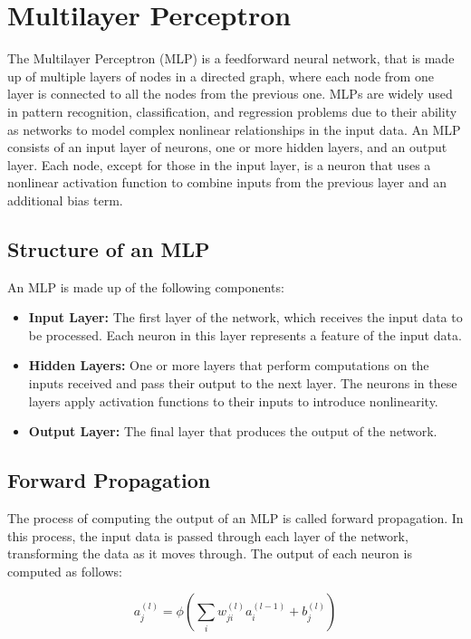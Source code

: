 \section{Multilayer Perceptron}
The Multilayer Perceptron (MLP) \cite{multilayer_perceptron} is a feedforward neural network, that is made up of multiple layers of nodes in a directed graph, where each node from one layer is connected to all the nodes from the previous one.
MLPs are widely used in pattern recognition, classification, and regression problems due to their ability as networks to model complex nonlinear relationships in the input data.
An MLP consists of an input layer of neurons, one or more hidden layers, and an output layer.
Each node, except for those in the input layer, is a neuron that uses a nonlinear activation function to combine inputs from the previous layer and an additional bias term.

\subsection{Structure of an MLP}

An MLP is made up of the following components:
\begin{itemize}
	\item \textbf{Input Layer:} The first layer of the network, which receives the input data to be processed. Each neuron in this layer represents a feature of the input data.
	\item \textbf{Hidden Layers:} One or more layers that perform computations on the inputs received and pass their output to the next layer. The neurons in these layers apply activation functions to their inputs to introduce nonlinearity.
	\item \textbf{Output Layer:} The final layer that produces the output of the network.
\end{itemize}

\subsection{Forward Propagation}

The process of computing the output of an MLP is called forward propagation.
In this process, the input data is passed through each layer of the network, transforming the data as it moves through. The output of each neuron is computed as follows:

\begin{equation}
	a^{(l)}_j = \phi\left(\sum_{i} w^{(l)}_{ji} a^{(l-1)}_i + b^{(l)}_j\right)
\end{equation}

